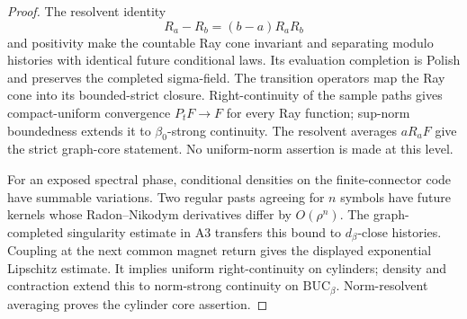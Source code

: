 \begin{proof}
The resolvent identity
\[
 R_a-R_b=(b-a)R_aR_b
\]
and positivity make the countable Ray cone invariant and separating modulo
histories with identical future conditional laws.  Its evaluation completion
is Polish and preserves the completed sigma-field.  The transition operators
map the Ray cone into its bounded-strict closure.  Right-continuity of the
sample paths gives compact-uniform convergence
\(P_tF\to F\) for every Ray function; sup-norm boundedness extends it to
\(\beta_0\)-strong continuity.  The resolvent averages \(aR_aF\) give the
strict graph-core statement.  No uniform-norm assertion is made at this level.

For an exposed spectral phase, conditional densities on the finite-connector
code have summable variations.  Two regular pasts agreeing for \(n\) symbols
have future kernels whose Radon--Nikodym derivatives differ by
\(O(\rho^n)\).  The graph-completed singularity estimate in A3 transfers this
bound to \(d_\beta\)-close histories.  Coupling at the next common magnet
return gives the displayed exponential Lipschitz estimate.  It implies
uniform right-continuity on cylinders; density and contraction extend this to
norm-strong continuity on \(\mathrm{BUC}_\beta\).  Norm-resolvent averaging
proves the cylinder core assertion.
\end{proof}